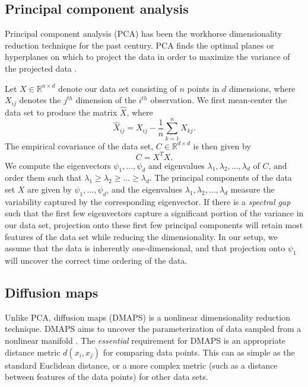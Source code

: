 \documentclass[10pt]{article}
\begin{document}
\subsection*{Principal component analysis}
Principal component analysis (PCA) has been the workhorse dimensionality reduction technique for the past century.
%
PCA finds the optimal planes or hyperplanes on which to project the data in order to maximize the variance of the projected data \cite{shlens2005tutorial}.

Let $X \in \mathbb{R}^{n \times d}$ denote our data set consisting of $n$ points in $d$ dimensions, where $X_{ij}$ denotes the $j^{th}$ dimension of the $i^{th}$ observation. 
%
We first mean-center the data set to produce the matrix $\hat{X}$, where
\begin{equation}
\hat{X}_{ij} = X_{ij} - \frac{1}{n} \sum_{k=1}^n X_{kj}.
\end{equation}
%
The empirical covariance of the data set, $C \in \mathbb{R}^{d \times d}$ is then given by
\begin{equation}
C = X^T X.
\end{equation}
%
We compute the eigenvectors $\psi_1, \dots, \psi_d$ and eigenvalues $\lambda_1, \lambda_2, \dots, \lambda_d$ of $C$, and order them such that $\lambda_1 \ge \lambda_2 \ge \dots \ge \lambda_d$.
%
The principal components of the data set $X$ are given by $\psi_1, \dots, \psi_d$, and the eigenvalues $\lambda_1, \lambda_2, \dots, \lambda_d$ measure the variability captured by the corresponding eigenvector. 
%
If there is a {\em spectral gap} such that the first few eigenvectors capture a significant portion of the variance in our data set, projection onto these first few principal components will retain most features of the data set while reducing the dimensionality.
%
In our setup, we assume that the data is inherently one-dimensional, and that projection onto $\psi_1$ will uncover the correct time ordering of the data.

\subsection*{Diffusion maps}
Unlike PCA, diffusion maps (DMAPS) is a nonlinear dimensionality reduction technique. 
%
DMAPS aims to uncover the parameterization of data sampled from a nonlinear manifold \cite{coifman2005geometric}.
%
The {\em essential} requirement for DMAPS is an appropriate distance metric $d(x_i, x_j)$ for comparing data points. 
%
This can as simple as the standard Euclidean distance, or a more complex metric (such as a distance between features of the data points) for other data sets.
\end{document}

